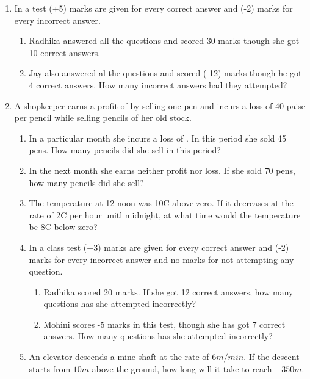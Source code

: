 \begin{enumerate}[label=\thesubsection.\arabic*, ref=\thesubsection.\theenumi,resume*]
	\item In a test (+5) marks are given for every correct answer and (-2) marks for every incorrect answer.  
		\begin{enumerate}
			\item Radhika answered all the questions and scored 30 marks though she got 10 correct answers.
			\item Jay also answered al the questions and scored (-12) marks though he got 4 correct answers.  How many incorrect answers had they  attempted?
		\end{enumerate}
	\item A shopkeeper earns a profit of  by selling one pen and incurs a loss of 40 paise per pencil while selling pencils of her old stock.  
		\begin{enumerate}
			\item In a particular month she incurs a loss of .  In this period she sold 45 pens.  How many pencils did she sell in this period?
			\item In the next month she earns neither profit nor loss.  If she sold 70 pens, how many pencils did she sell?
			\item The temperature at 12 noon was 10\degree C above zero. If it decreases at the rate of 2\degree C per hour unitl midnight, at what time would the temperature be 8\degree C below zero? 
	\item In a class test (+3) marks are given for every correct answer and (-2) marks for every incorrect answer and no marks for not attempting any question.   
		\begin{enumerate}
			\item Radhika scored 20 marks.  If she got 12 correct answers, how many questions has she attempted incorrectly?
			\item Mohini scores -5 marks in this test, though she has got 7 correct answers.   How many questions has she attempted incorrectly?
		\end{enumerate}
	\item An elevator descends a mine shaft at the rate of $6m/min$.  If the descent starts from $10m$ above the ground, how long will it take to reach $-350m$.
		\end{enumerate}
\end{enumerate}
